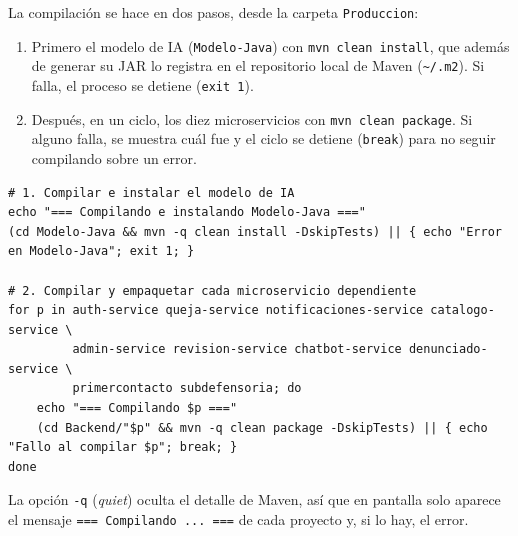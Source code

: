 La compilación se hace en dos pasos, desde la carpeta \texttt{Produccion}:
\begin{enumerate}
  \item Primero el modelo de IA (\texttt{Modelo-Java}) con \texttt{mvn clean install}, que además de generar su JAR lo registra en el repositorio local de Maven (\texttt{\textasciitilde/.m2}). Si falla, el proceso se detiene (\texttt{exit 1}).
  \item Después, en un ciclo, los diez microservicios con \texttt{mvn clean package}. Si alguno falla, se muestra cuál fue y el ciclo se detiene (\texttt{break}) para no seguir compilando sobre un error.
\end{enumerate}
\begin{lstlisting}
# 1. Compilar e instalar el modelo de IA
echo "=== Compilando e instalando Modelo-Java ==="
(cd Modelo-Java && mvn -q clean install -DskipTests) || { echo "Error en Modelo-Java"; exit 1; }

# 2. Compilar y empaquetar cada microservicio dependiente
for p in auth-service queja-service notificaciones-service catalogo-service \
         admin-service revision-service chatbot-service denunciado-service \
         primercontacto subdefensoria; do
    echo "=== Compilando $p ==="
    (cd Backend/"$p" && mvn -q clean package -DskipTests) || { echo "Fallo al compilar $p"; break; }
done
\end{lstlisting}
La opción \texttt{-q} (\emph{quiet}) oculta el detalle de Maven, así que en pantalla solo aparece el mensaje \texttt{=== Compilando ... ===} de cada proyecto y, si lo hay, el error.

